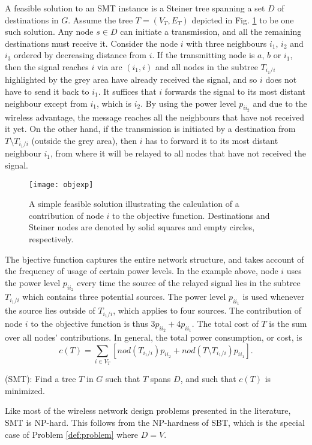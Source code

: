 A feasible solution to an SMT instance is a Steiner tree spanning a set $D$ of destinations in $G$. Assume the tree $T=(V_T, E_T)$ depicted in Fig. \ref{fig:objexp} to be one such solution. Any node $s\in D$ can initiate a transmission, and all the remaining destinations must receive it. Consider the node $i$ with three neighbours $i_1$, $i_2$ and $i_3$ ordered by decreasing distance from $i$. If the transmitting node is $a$, $b$ or $i_1$, then the signal reaches $i$ via arc $(i_1,i)$ and all nodes in the subtree $T_{i_1/i}$ highlighted by the grey area have already received the signal, and so $i$ does not have to send it back to $i_1$. It suffices that $i$ forwards the signal to its most distant neighbour except from $i_1$, which is $i_2$. By using the power level $p_{ii_2}$ and due to the wireless advantage, the message reaches all the neighbours that have not received it yet. On the other hand, if the transmission is initiated by a destination from $T\setminus T_{i_1/i}$ (outside the grey area), then $i$ has to forward it to its most distant neighbour $i_1$, from where it will be relayed to all nodes that have not received the signal.
\begin{figure}[h!]
        \centering
        \texttt{[image: objexp]}
        \caption{A simple feasible solution illustrating the calculation of a contribution of node $i$ to the objective function. Destinations and Steiner nodes are denoted by solid squares and empty circles, respectively.}
                \label{fig:objexp}
\end{figure}

 The bjective function captures the entire network structure, and takes account of the  frequency of usage of certain power levels. In the example above, node $i$ uses the power level $p_{ii_2}$ every time the source of the relayed signal lies in the subtree $T_{i_1/i}$ which contains three potential sources. The power level $p_{ii_1}$ is used  whenever the source lies outside of $T_{i_1/i}$, which applies to four sources. The contribution of node $i$ to the objective function is thus $3p_{ii_2} + 4p_{ii_1}$. The total cost of $T$ is the sum over all nodes' contributions. In general, the total power consumption, or cost, is
$$
c(T) = \sum\limits_{i\in V_T}\left[nod(T_{i_1/i})p_{ii_2} + nod(T\setminus T_{i_1/i})p_{ii_1}\right].
$$ 
\begin{problem}\label{def:problem}
(SMT): Find a tree $T$ in $G$ such that $T$ spans $D$, and such that $c(T)$ is minimized.
\end{problem}
Like most of the wireless network design problems presented in the literature, SMT is NP-hard. This follows from the NP-hardness of SBT\cite{Papadimitriou06SBT}, which is the special case of Problem \ref{def:problem} where $D=V$.

